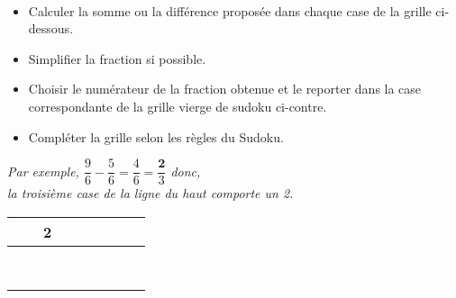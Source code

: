\begin{colonne*exercice}
\end{colonne*exercice}


\Recreation

\begin{enigme}[Sudofractions]
\ \\
   \begin{minipage}{7.5cm}
      \begin{itemize}
         \item Calculer la somme ou la différence proposée dans chaque case de la grille ci-dessous.
         \item Simplifier la fraction si possible.
         \item Choisir le numérateur de la fraction obtenue et le reporter dans la case correspondante de la grille vierge de sudoku ci-contre.
         \item Compléter la grille selon les règles du Sudoku.
      \end{itemize}
      {\it Par exemple, $\dfrac96-\dfrac56 =\dfrac46 =\dfrac{\textbf{2}}{3}$ donc, \\ [1mm]
         la troisième case de la ligne du haut comporte un 2}.
   \end{minipage}
   \qquad
   \begin{minipage}{7cm}
   {
      \begin{tabular}{|*{3}{C{0.5}|}|*{3}{C{0.5}|}|*{3}{C{0.5}|}}
         \hline
         & & {\bf 2} & & & & & & \\
         \hline
         & & & & & & & & \\
         \hline
         & & & & & & & & \\
         \hline
         \hline
         & & & & & & & & \\
         \hline
         & & & & & & & & \\
         \hline
         & & & & & & & & \\
         \hline
         \hline
         & & & & & & & & \\
         \hline
         & & & & & & & & \\
         \hline
         & & & & & & & & \\
         \hline
      \end{tabular}}
   \end{minipage}
  \vfill
   \begin{center}
   {
   \footnotesize
      \begin{tabular}{|*{3}{C{0.9}|}|*{3}{C{0.9}|}|*{3}{C{0.9}|}}

\end{tabular}}
\end{center}
\end{enigme}
